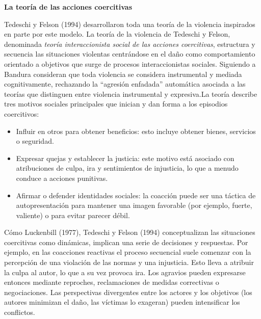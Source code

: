 \documentclass[
  spanish,
  letterpaper,
  DIV=11,
  numbers=noendperiod]{scrreprt}
\begin{document}
\begin{tcolorbox}[enhanced jigsaw, bottomtitle=1mm, toprule=.15mm, colbacktitle=quarto-callout-note-color!10!white, bottomrule=.15mm, leftrule=.75mm, colframe=quarto-callout-note-color-frame, opacitybacktitle=0.6, titlerule=0mm, breakable, colback=white, left=2mm, arc=.35mm, title=\textcolor{quarto-callout-note-color}{\faInfo}\hspace{0.5em}{Nota}, toptitle=1mm, coltitle=black, rightrule=.15mm, opacityback=0]

\textbf{La teoría de las acciones coercitivas}

Tedeschi y Felson (1994) desarrollaron toda una teoría de la violencia
inspirados en parte por este modelo. La teoría de la violencia de
Tedeschi y Felson, denominada \emph{teoría interaccionista social de las
acciones coercitivas}, estructura y secuencia las situaciones violentas
centrándose en el daño como comportamiento orientado a objetivos que
surge de procesos interaccionistas sociales. Siguiendo a Bandura
consideran que toda violencia se considera instrumental y mediada
cognitivamente, rechazando la ``agresión enfadada'' automática asociada
a las teorías que distinguen entre violencia instrumental y expresiva.La
teoría describe tres motivos sociales principales que inician y dan
forma a los episodios coercitivos:

\begin{itemize}
\item
  Influir en otros para obtener beneficios: esto incluye obtener bienes,
  servicios o seguridad.
\item
  Expresar quejas y establecer la justicia: este motivo está asociado
  con atribuciones de culpa, ira y sentimientos de injusticia, lo que a
  menudo conduce a acciones punitivas.
\item
  Afirmar o defender identidades sociales: la coacción puede ser una
  táctica de autopresentación para mantener una imagen favorable (por
  ejemplo, fuerte, valiente) o para evitar parecer débil.
\end{itemize}

Cómo Luckenbill (1977), Tedeschi y Felson (1994) conceptualizan las
situaciones coercitivas como dinámicas, implican una serie de decisiones
y respuestas. Por ejemplo, en las coacciones reactivas el proceso
secuencial suele comenzar con la percepción de una violación de las
normas y una injusticia. Esto lleva a atribuir la culpa al autor, lo que
a su vez provoca ira. Los agravios pueden expresarse entonces mediante
reproches, reclamaciones de medidas correctivas o negociaciones. Las
perspectivas divergentes entre los actores y los objetivos (los autores
minimizan el daño, las víctimas lo exageran) pueden intensificar los
conflictos.


\end{tcolorbox}
\end{document}

